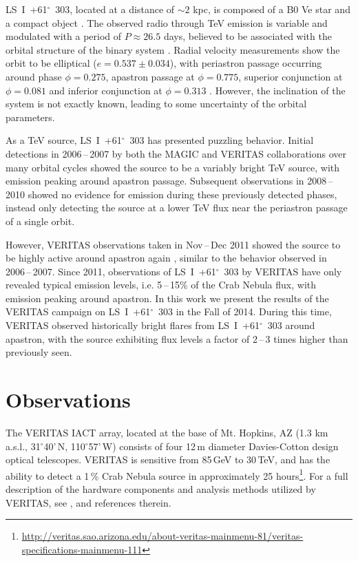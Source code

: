 \documentclass[preprint2]{aastex}
\newcommand{\lsi}{LS~I~+61$^{\circ}$~303}
\newcommand{\gev}{\,GeV}
\newcommand{\tev}{\,TeV}
\begin{document}
\lsi{}, located at a distance of $\sim2$ kpc, is composed of a B0 Ve star and a compact object \citep{HandC1981, Casares2005}. The observed radio through TeV emission is variable and modulated with a period of $P \approx 26.5$ days, believed to be associated with the orbital structure of the binary system \citep{Albert2006, Esposito2007, VERITASLSIDetection, Abdo2009, LiXray, 2015A&A...575L...9M}. Radial velocity measurements show the orbit to be elliptical ($e = 0.537\pm0.034$), with periastron passage occurring around phase $\phi=0.275$, apastron passage at $\phi=0.775$, superior conjunction at $\phi=0.081$ and inferior conjunction at $\phi=0.313$ \citep{Aragona2009}. However, the inclination of the system is not exactly known, leading to some uncertainty of the orbital parameters.

As a TeV source, \lsi{} has presented puzzling behavior. Initial detections in 2006\,--\,2007 by both the MAGIC \citep{Albert2006} and VERITAS \citep{VERITASLSIDetection} collaborations over many orbital cycles showed the source to be a variably bright TeV source, with emission peaking around apastron passage. Subsequent observations in 2008\,--\,2010 \citep{2011ApJ...738....3A} showed no evidence for emission during these previously detected phases, instead only detecting the source at a lower TeV flux near the periastron passage of a single orbit. 

However, VERITAS observations taken in Nov\,--\,Dec 2011 showed the source to be highly active around apastron again \citep{2013ApJ...779...88A}, similar to the behavior observed in 2006\,--\,2007. Since 2011, observations of \lsi{} by VERITAS have only revealed typical emission levels, i.e. 5\,--\,15\% of the Crab Nebula flux, with emission peaking around apastron. In this work we present the results of the VERITAS campaign on \lsi{} in the Fall of 2014. During this time, VERITAS observed historically bright flares from \lsi{} around apastron, with the source exhibiting flux levels a factor of 2\,--\,3 times higher than previously seen.

\section{Observations}
The VERITAS IACT array, located at the base of Mt. Hopkins, AZ (1.3 km a.s.l., 31$^{\circ}$40'\,N, 110$^{\circ}$57'\,W) consists of four 12\,m diameter Davies-Cotton design optical telescopes. VERITAS is sensitive from 85\gev{} to 30\tev{}, and has the ability to detect a 1\,\% Crab Nebula source in approximately 25 hours\footnote{\url{http://veritas.sao.arizona.edu/about-veritas-mainmenu-81/veritas-specifications-mainmenu-111}}. For a full description of the hardware components and analysis methods utilized by VERITAS, see \citet{VERITAS, KiedaVTSUpgrade, VERITASLSIDetection}, and references therein.
\end{document}
